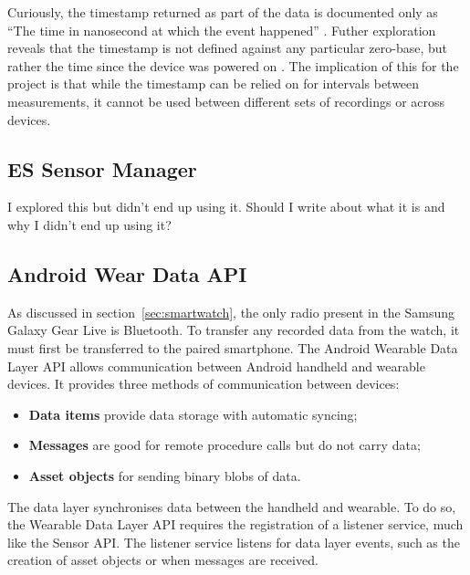       Curiously, the timestamp returned as part of the data is documented only as ``The time in nanosecond at which the event happened'' \cite{androidsensoreventapi}. Futher exploration reveals that the timestamp is not defined against any particular zero-base, but rather the time since the device was powered on \cite{androidissuedocumentationbug, androidissuehardwarebug}. The implication of this for the project is that while the timestamp can be relied on for intervals between measurements, it cannot be used between different sets of recordings or across devices.
      
      
    \subsection{ES Sensor Manager}
      I explored this but didn't end up using it. Should I write about what it is and why I didn't
      end up using it?

    \subsection{Android Wear Data API}
      \label{sec:prep-data-api}
      As discussed in section~\ref{sec:smartwatch}, the only radio present in the Samsung Galaxy 
      Gear Live is Bluetooth. To transfer any recorded data from the watch, it must first be transferred to the paired smartphone. 
      The Android Wearable Data Layer API allows communication between Android handheld and wearable
      devices. It provides three methods of communication between devices:
      \begin{itemize}
        \item \textbf{Data items} provide data storage with automatic syncing;
        \item \textbf{Messages} are good for remote procedure calls but do not carry data;
        \item \textbf{Asset objects} for sending binary blobs of data.
      \end{itemize}
      
      The data layer synchronises data between the handheld and wearable. To do so, the Wearable Data Layer API requires the registration of a listener service, much like the Sensor API. The listener service listens for data layer events, such as the creation of asset objects or when messages are received.      
      
